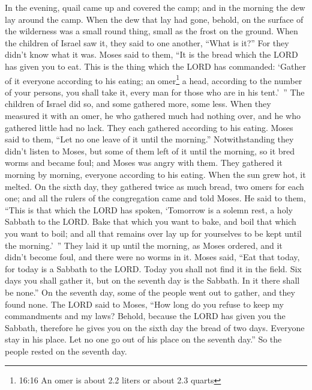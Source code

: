 \myverse{}In the evening, quail came up and covered the camp; and in the
morning the dew lay around the camp.
\myverse{}When the dew that lay had gone, behold, on the surface of the wilderness
was a small round thing, small as the frost on the ground.
\myverse{}When the children of Israel saw it, they said to one another, “What is it?”
For they didn’t know what it was. Moses said to them, “It is the bread which the LORD has given you to
eat.
\myverse{}This is the thing which the LORD has commanded: ‘Gather of it everyone according
to his eating; an omer\footnote{16:16 An omer is about 2.2 liters or about 2.3 quarts} a head, according to the number of your
persons, you shall take it, every man for those who are in his tent.’ ”
\myverse{}The children of Israel did so, and some gathered more, some less.
\myverse{}When they measured it with an omer, he who gathered much had nothing over,
and he who gathered little had no lack. They each gathered according to his eating.
\myverse{}Moses said to them, “Let no one leave of it until the morning.”
\myverse{}Notwithstanding they didn’t listen to Moses, but some of them left of it
until the morning, so it bred worms and became foul; and Moses was angry with them.
\myverse{}They gathered it morning by morning, everyone according to his eating. When
the sun grew hot, it melted.
\myverse{}On the sixth day, they gathered twice as much bread, two omers for each one;
and all the rulers of the congregation came and told Moses.
\myverse{}He said to them, “This is that which the LORD has spoken, ‘Tomorrow is a
solemn rest, a holy Sabbath to the LORD. Bake that which you want to bake, and boil that which you want
to boil; and all that remains over lay up for yourselves to be kept until the morning.’ ”
\myverse{}They laid it up until the morning, as Moses ordered, and it didn’t become
foul, and there were no worms in it.
\myverse{}Moses said, “Eat that today, for today is a Sabbath to the LORD. Today you
shall not find it in the field.
\myverse{}Six days you shall gather it, but on the seventh day is the Sabbath. In it
there shall be none.”
\myverse{}On the seventh day, some of the people went out to gather, and they found
none.
\myverse{}The LORD said to Moses, “How long do you refuse to keep my commandments and
my laws?
\myverse{}Behold, because the LORD has given you the Sabbath, therefore he gives you
on the sixth day the bread of two days. Everyone stay in his place. Let no one go out of his place on
the seventh day.”
\myverse{}So the people rested on the seventh day.


